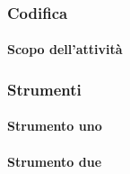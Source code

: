 \subsubsection{Codifica}
 \paragraph{Scopo dell'attività}
 

\subsubsection{Strumenti}
  \paragraph{Strumento uno}

 \paragraph{Strumento due}



  

